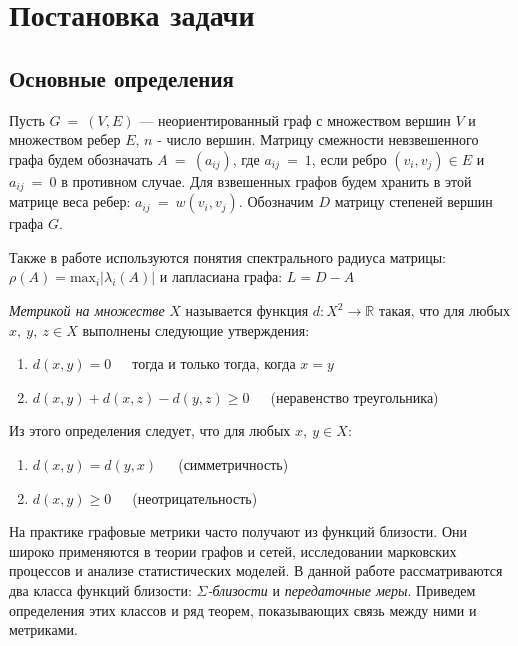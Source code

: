 \chapter{Постановка задачи} \label{chapt1}

\section{Основные определения} \label{sect1_1}

Пусть $G~=~(V, E)$ --- неориентированный граф с множеством вершин $V$ и множеством ребер $E$, $n$ - число вершин. Матрицу смежности невзвешенного графа будем обозначать $A~=~(a_{ij})$, где $a_{ij}~=~1$, если ребро $(v_i, v_j) \in E$ и $a_{ij}~=~0$ в противном случае. Для взвешенных графов будем хранить в этой матрице веса ребер: $a_{ij}~=~w(v_i, v_j)$. Обозначим $D$ матрицу степеней вершин графа $G$.

Также в работе используются понятия спектрального радиуса матрицы: $\rho(A) = \text{max}_i |\lambda_i(A)|$ и лапласиана графа: $L = D - A$

\begin{definition}
\emph{Метрикой на множестве} $X$ называется функция $d: X^2\rightarrow \mathbb{R}$ такая, что для любых $x,\ y,\ z \in X$ выполнены следующие утверждения:
\begin{enumerate}
\item $d(x,y) = 0$\ \ \  тогда и только тогда, когда $x=y$
\item $d(x,y) + d(x,z) - d(y,z) \ge 0$\ \ \  (неравенство треугольника)
\end{enumerate}
\end{definition}

Из этого определения следует, что для любых $x,\ y \in X$:

\begin{enumerate}
\item $d(x,y) = d(y,x)$\ \ \ (симметричность)
\item $d(x,y) \ge 0$\ \ \  (неотрицательность)
\end{enumerate}


На практике графовые метрики часто получают из функций близости. Они широко применяются в теории графов и сетей, исследовании марковских процессов и анализе статистических моделей. В данной работе рассматриваются два класса функций близости: $\Sigma$\emph{-близости} и \emph{передаточные меры}. Приведем определения этих классов и ряд теорем, показывающих связь между ними и метриками.

